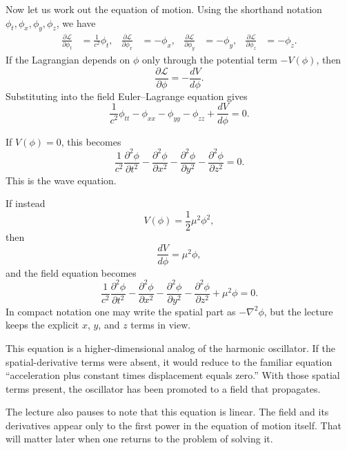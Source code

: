Now let us work out the equation of motion. Using the shorthand notation \(\phi_t,\phi_x,\phi_y,\phi_z\), we have
\begin{align}
\frac{\partial \mathcal{L}}{\partial \phi_t} &= \frac{1}{c^2}\phi_t, &
\frac{\partial \mathcal{L}}{\partial \phi_x} &= -\phi_x, &
\frac{\partial \mathcal{L}}{\partial \phi_y} &= -\phi_y, &
\frac{\partial \mathcal{L}}{\partial \phi_z} &= -\phi_z.
\end{align}
If the Lagrangian depends on \(\phi\) only through the potential term \(-V(\phi)\), then
\begin{equation}
\frac{\partial \mathcal{L}}{\partial \phi}=-\frac{dV}{d\phi}.
\end{equation}
Substituting into the field Euler--Lagrange equation gives
\begin{equation}
\frac{1}{c^2}\phi_{tt}-\phi_{xx}-\phi_{yy}-\phi_{zz}+\frac{dV}{d\phi}=0.
\end{equation}

If \(V(\phi)=0\), this becomes
\begin{equation}
\frac{1}{c^2}\frac{\partial^2\phi}{\partial t^2}
-\frac{\partial^2\phi}{\partial x^2}
-\frac{\partial^2\phi}{\partial y^2}
-\frac{\partial^2\phi}{\partial z^2}
=0.
\end{equation}
This is the wave equation.

If instead
\begin{equation}
V(\phi)=\frac12\mu^2\phi^2,
\end{equation}
then
\begin{equation}
\frac{dV}{d\phi}=\mu^2\phi,
\end{equation}
and the field equation becomes
\begin{equation}
\frac{1}{c^2}\frac{\partial^2\phi}{\partial t^2}
-\frac{\partial^2\phi}{\partial x^2}
-\frac{\partial^2\phi}{\partial y^2}
-\frac{\partial^2\phi}{\partial z^2}
+\mu^2\phi
=0.
\end{equation}
In compact notation one may write the spatial part as \(-\nabla^2\phi\), but the lecture keeps the explicit \(x\), \(y\), and \(z\) terms in view.

This equation is a higher-dimensional analog of the harmonic oscillator. If the spatial-derivative terms were absent, it would reduce to the familiar equation ``acceleration plus constant times displacement equals zero.'' With those spatial terms present, the oscillator has been promoted to a field that propagates.

The lecture also pauses to note that this equation is linear. The field and its derivatives appear only to the first power in the equation of motion itself. That will matter later when one returns to the problem of solving it.

